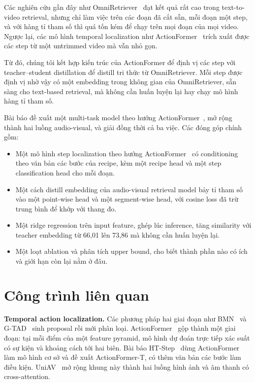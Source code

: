 \documentclass{IEEEtran}
\begin{document}
Các nghiên cứu gần đây như OmniRetriever~\cite{omniretriever} đạt kết quả rất cao trong text-to-video retrieval, nhưng chỉ làm việc trên các đoạn đã cắt sẵn, mỗi đoạn một step, và với hàng tỉ tham số thì quá tốn kém để chạy trên mọi đoạn của mọi video. Ngược lại, các mô hình temporal localization như ActionFormer~\cite{actionformer} trích xuất được các step từ một untrimmed video mà vẫn nhỏ gọn.

Từ đó, chúng tôi kết hợp kiến trúc của ActionFormer để định vị các step với teacher--student distillation để distill tri thức từ OmniRetriever. Mỗi step được định vị nhờ vậy có một embedding trong không gian của OmniRetriever, sẵn sàng cho text-based retrieval, mà không cần huấn luyện lại hay chạy mô hình hàng tỉ tham số.

Bài báo đề xuất một multi-task model theo hướng ActionFormer~\cite{actionformer}, mở rộng thành hai luồng audio-visual, và giải đồng thời cả ba việc. Các đóng góp chính gồm:
\begin{itemize}
\item Một mô hình step localization theo hướng ActionFormer~\cite{actionformer} có conditioning theo văn bản các bước của recipe, kèm một recipe head và một step classification head cho mỗi đoạn.
\item Một cách distill embedding của audio-visual retrieval model bảy tỉ tham số vào một point-wise head và một segment-wise head, với cosine loss đã trừ trung bình để khớp với thang đo.
\item Một ridge regression trên input feature, ghép lúc inference, tăng similarity với teacher embedding từ 66,01 lên 73,86 mà không cần huấn luyện lại.
\item Một loạt ablation và phân tích upper bound, cho biết thành phần nào có ích và giới hạn còn lại nằm ở đâu.
\end{itemize}

\section{Công trình liên quan}
\textbf{Temporal action localization.} Các phương pháp hai giai đoạn như BMN~\cite{bmn} và G-TAD~\cite{gtad} sinh proposal rồi mới phân loại. ActionFormer~\cite{actionformer} gộp thành một giai đoạn: tại mỗi điểm của một feature pyramid, mô hình dự đoán trực tiếp xác suất có sự kiện và khoảng cách tới hai biên. Bài báo HT-Step~\cite{htstep} dùng ActionFormer làm mô hình cơ sở và đề xuất ActionFormer-T, có thêm văn bản các bước làm điều kiện. UniAV~\cite{uniav} mở rộng khung này thành hai luồng hình ảnh và âm thanh có cross-attention.
\end{document}
